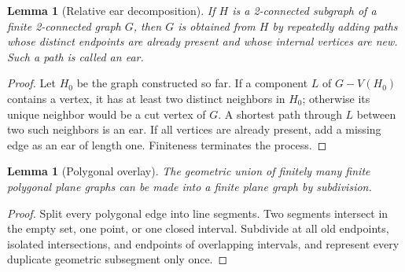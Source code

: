 \documentclass[11pt]{article}
\theoremstyle{mainplain}
\newtheorem{lemma}[theorem]{Lemma}
\theoremstyle{mainroman}
\theoremstyle{definition}
\numberwithin{equation}{section}
\begin{document}
\begin{lemma}[Relative ear decomposition]\label{lem:relative-ear}
If $H$ is a 2-connected subgraph of a finite 2-connected graph $G$,
then $G$ is obtained from $H$ by repeatedly adding paths whose distinct
endpoints are already present and whose internal vertices are new.
Such a path is called an \emph{ear}.
\end{lemma}
\begin{proof}
Let $H_0$ be the graph constructed so far. If a component $L$ of
$G-V(H_0)$ contains a vertex, it has at least two distinct neighbors in
$H_0$; otherwise its unique neighbor would be a cut vertex of $G$. A
shortest path through $L$ between two such neighbors is an ear. If all
vertices are already present, add a missing edge as an ear of length
one. Finiteness terminates the process.
\end{proof}

\begin{lemma}[Polygonal overlay]\label{lem:polygonal-overlay}
The geometric union of finitely many finite polygonal plane graphs can
be made into a finite plane graph by subdivision.
\end{lemma}
\begin{proof}
Split every polygonal edge into line segments. Two segments intersect
in the empty set, one point, or one closed interval. Subdivide at all
old endpoints, isolated intersections, and endpoints of overlapping
intervals, and represent every duplicate geometric subsegment only
once.
\end{proof}
\end{document}
